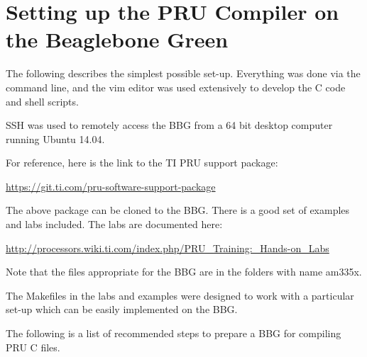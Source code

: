 %
%
%

\chapter{Setting up the PRU Compiler on the Beaglebone Green}

The following describes the simplest possible set-up.  Everything was done via the command line, and the vim editor was used extensively to develop the C code and shell scripts.

SSH was used to remotely access the BBG from a 64 bit desktop computer running Ubuntu 14.04.

For reference, here is the link to the TI PRU support package:

\url{https://git.ti.com/pru-software-support-package}

The above package can be cloned to the BBG.  There is a good set of examples and labs included.  The labs are documented here:

\url{http://processors.wiki.ti.com/index.php/PRU_Training:_Hands-on_Labs}

Note that the files appropriate for the BBG are in the folders with name am335x.

The Makefiles in the labs and examples were designed to work with a particular set-up which can be easily implemented on the BBG.

The following is a list of recommended steps to prepare a BBG for compiling PRU C files.


